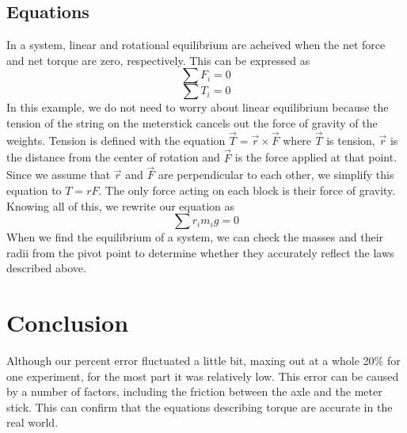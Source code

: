 \documentclass[12pt]{article}
\begin{document}
        \subsection{Equations}
            In a system, linear and rotational equilibrium are acheived when
            the net force and net torque are zero, respectively. This can be
            expressed as
            \begin{equation}
                \sum F_i = 0
            \end{equation}
            \begin{equation}
                \sum T_i = 0
            \end{equation}
            In this example, we do not need to worry about linear equilibrium
            because the tension of the string on the meterstick cancels out the
            force of gravity of the weights. Tension is defined with the
            equation $\vec{T} = \vec{r} \times \vec{F}$ where $\vec{T}$ is tension, 
            $\vec{r}$ is the distance from the center of rotation and $\vec{F}$
            is the force applied at that point. Since we assume that $\vec{r}$
            and $\vec{F}$ are perpendicular to each other, we simplify this
            equation to $T = rF$. The only force acting on each block is their
            force of gravity. Knowing all of this, we rewrite our equation as
            \begin{equation}
                \sum r_im_ig = 0
            \end{equation}
            When we find the equilibrium of a system, we can check the masses
            and their radii from the pivot point to determine whether they
            accurately reflect the laws described above.
    
    \section{Conclusion}
        Although our percent error fluctuated a little bit, maxing out at a
        whole 20\% for one experiment, for the most part it was relatively low.
        This error can be caused by a number of factors, including the friction
        between the axle and the meter stick.
        This can confirm that the equations describing torque are accurate in
        the real world.
\end{document}
